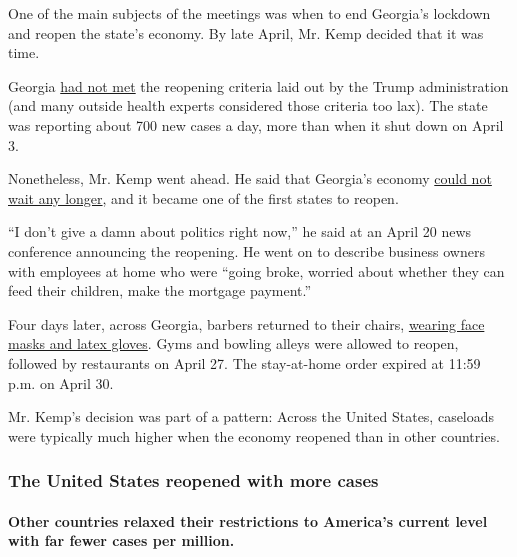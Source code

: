 One of the main subjects of the meetings was when to end Georgia's
lockdown and reopen the state's economy. By late April, Mr. Kemp decided
that it was time.

Georgia
\href{https://www.nytimes.com/interactive/2020/05/07/us/coronavirus-states-reopen-criteria.html}{had
not met} the reopening criteria laid out by the Trump administration
(and many outside health experts considered those criteria too lax). The
state was reporting about 700 new cases a day, more than when it shut
down on April 3.

Nonetheless, Mr. Kemp went ahead. He said that Georgia's economy
\href{https://gov.georgia.gov/press-releases/2020-04-20/gov-kemp-updates-georgians-covid-19}{could
not wait any longer}, and it became one of the first states to reopen.

``I don't give a damn about politics right now,'' he said at an April 20
news conference announcing the reopening. He went on to describe
business owners with employees at home who were ``going broke, worried
about whether they can feed their children, make the mortgage payment.''

Four days later, across Georgia, barbers returned to their chairs,
\href{https://www.nytimes.com/2020/04/24/us/coronavirus-georgia-oklahoma-alaska-reopen.html}{wearing
face masks and latex gloves}. Gyms and bowling alleys were allowed to
reopen, followed by restaurants on April 27. The stay-at-home order
expired at 11:59 p.m. on April 30.

Mr. Kemp's decision was part of a pattern: Across the United States,
caseloads were typically much higher when the economy reopened than in
other countries.

\hypertarget{the-united-states-reopened-with-more-cases}{%
\subsubsection{The United States reopened with more
cases}\label{the-united-states-reopened-with-more-cases}}

\hypertarget{other-countries-relaxed-their-restrictions-to-americas-current-level-with-far-fewer-cases-per-million}{%
\paragraph{Other countries relaxed their restrictions to America's
current level with far fewer cases per
million.}\label{other-countries-relaxed-their-restrictions-to-americas-current-level-with-far-fewer-cases-per-million}}


